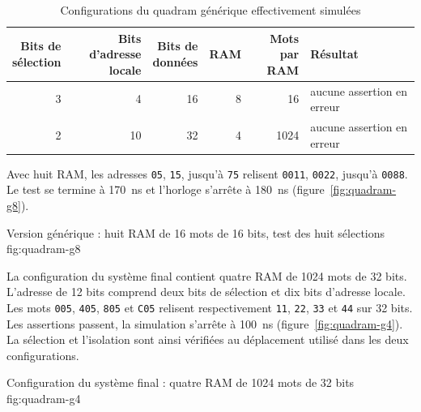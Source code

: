 \begin{table}[H]
\centering
\begin{tabular}{rrrrrl}
\toprule
\makecell{Bits de\\sélection} & \makecell{Bits d'adresse\\locale} &
\makecell{Bits de\\données} & RAM & \makecell{Mots\\par RAM} & Résultat \\
\midrule
3 & 4 & 16 & 8 & 16 & aucune assertion en erreur \\
2 & 10 & 32 & 4 & 1024 & aucune assertion en erreur \\
\bottomrule
\end{tabular}
\caption{Configurations du quadram générique effectivement simulées}
\label{tab:quadram-configs}
\end{table}

Avec huit RAM, les adresses \texttt{05}, \texttt{15}, jusqu'à \texttt{75} relisent
\texttt{0011}, \texttt{0022}, jusqu'à \texttt{0088}. Le test se termine à 170~ns et
l'horloge s'arrête à 180~ns (figure~\ref{fig:quadram-g8}).

{Version générique : huit RAM de 16 mots de 16 bits, test des huit sélections}
{fig:quadram-g8}

La configuration du système final contient quatre RAM de 1024 mots de 32 bits.
L'adresse de 12 bits comprend deux bits de sélection et dix bits d'adresse locale.
Les mots \texttt{005}, \texttt{405}, \texttt{805} et \texttt{C05} relisent respectivement
\texttt{11}, \texttt{22}, \texttt{33} et \texttt{44} sur 32 bits. Les assertions passent,
la simulation s'arrête à 100~ns (figure~\ref{fig:quadram-g4}). La sélection et l'isolation
sont ainsi vérifiées au déplacement utilisé dans les deux configurations.

{Configuration du système final : quatre RAM de 1024 mots de 32 bits}
{fig:quadram-g4}
